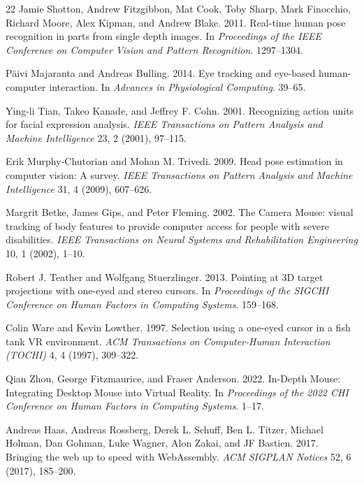 \documentclass[sigconf]{acmart}
\begin{document}
\begin{thebibliography}{22}
Jamie Shotton, Andrew Fitzgibbon, Mat Cook, Toby Sharp, Mark Finocchio, Richard Moore, Alex Kipman, and Andrew Blake. 2011.
\newblock Real-time human pose recognition in parts from single depth images.
\newblock In \emph{Proceedings of the IEEE Conference on Computer Vision and Pattern Recognition}. 1297--1304.

Päivi Majaranta and Andreas Bulling. 2014.
\newblock Eye tracking and eye-based human-computer interaction.
\newblock In \emph{Advances in Physiological Computing}. 39--65.

Ying-li Tian, Takeo Kanade, and Jeffrey F. Cohn. 2001.
\newblock Recognizing action units for facial expression analysis.
\newblock \emph{IEEE Transactions on Pattern Analysis and Machine Intelligence} 23, 2 (2001), 97--115.

Erik Murphy-Chutorian and Mohan M. Trivedi. 2009.
\newblock Head pose estimation in computer vision: A survey.
\newblock \emph{IEEE Transactions on Pattern Analysis and Machine Intelligence} 31, 4 (2009), 607--626.

Margrit Betke, James Gips, and Peter Fleming. 2002.
\newblock The Camera Mouse: visual tracking of body features to provide computer access for people with severe disabilities.
\newblock \emph{IEEE Transactions on Neural Systems and Rehabilitation Engineering} 10, 1 (2002), 1--10.

Robert J. Teather and Wolfgang Stuerzlinger. 2013.
\newblock Pointing at 3D target projections with one-eyed and stereo cursors.
\newblock In \emph{Proceedings of the SIGCHI Conference on Human Factors in Computing Systems}. 159--168.

Colin Ware and Kevin Lowther. 1997.
\newblock Selection using a one-eyed cursor in a fish tank VR environment.
\newblock \emph{ACM Transactions on Computer-Human Interaction (TOCHI)} 4, 4 (1997), 309--322.

Qian Zhou, George Fitzmaurice, and Fraser Anderson. 2022.
\newblock In-Depth Mouse: Integrating Desktop Mouse into Virtual Reality.
\newblock In \emph{Proceedings of the 2022 CHI Conference on Human Factors in Computing Systems}. 1--17.

Andreas Haas, Andreas Rossberg, Derek L. Schuff, Ben L. Titzer, Michael Holman, Dan Gohman, Luke Wagner, Alon Zakai, and JF Bastien. 2017.
\newblock Bringing the web up to speed with WebAssembly.
\newblock \emph{ACM SIGPLAN Notices} 52, 6 (2017), 185--200.


\end{thebibliography}
\end{document}
